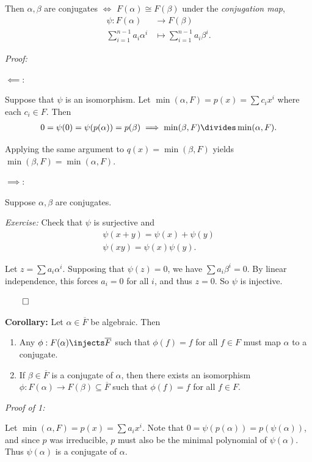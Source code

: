 Then \(\alpha, \beta\) are conjugates \(\iff\)
\(F(\alpha) \cong F(\beta)\) under the \emph{conjugation map},
\begin{align*}
\psi: F(\alpha) &\to F(\beta) \\
\sum_{i=1}^{n-1} a_i \alpha^i &\mapsto \sum_{i=1}^{n-1} a_i \beta^i
.\end{align*}

\emph{Proof:}

\(\impliedby\):

Suppose that \(\psi\) is an isomorphism. Let
\(\min(\alpha, F) = p(x) = \sum c_i x^i\) where each \(c_i \in F\). Then
\begin{align*}
0 = \psi(0) = \psi(p(\alpha)) = p(\beta) \implies \min(\beta, F) \divides \min(\alpha, F)
.\end{align*}

Applying the same argument to \(q(x) = \min(\beta, F)\) yields
\(\min(\beta, F) = \min(\alpha, F)\).

\(\implies\):

Suppose \(\alpha, \beta\) are conjugates.

\emph{Exercise:} Check that \(\psi\) is surjective and \begin{align*}
\psi(x+y) = \psi(x) + \psi(y) \\
\psi(xy) = \psi(x) \psi(y)
.\end{align*}

Let \(z = \sum a_i \alpha^i\). Supposing that \(\psi(z) = 0\), we have
\(\sum a_i \beta^i = 0\). By linear independence, this forces
\(a_i = 0\) for all \(i\), and thus \(z=0\). So \(\psi\) is injective.

\(\qed\)

\textbf{Corollary:} Let \(\alpha \in \overline F\) be algebraic. Then

\begin{enumerate}
\def\labelenumi{\arabic{enumi}.}
\item
  Any \(\phi: F(\alpha) \injects \overline F\) such that \(\phi(f) = f\)
  for all \(f\in F\) must map \(\alpha\) to a conjugate.
\item
  If \(\beta \in \overline F\) is a conjugate of \(\alpha\), then there
  exists an isomorphism
  \(\phi: F(\alpha) \to F(\beta) \subseteq \overline F\) such that
  \(\phi(f) = f\) for all \(f\in F\).
\end{enumerate}

\emph{Proof of 1:}

Let \(\min(\alpha, F) = p(x) = \sum a_i x^i\). Note that
\(0 = \psi(p(\alpha)) = p(\psi(\alpha))\), and since \(p\) was
irreducible, \(p\) must also be the minimal polynomial of
\(\psi(\alpha)\). Thus \(\psi(\alpha)\) is a conjugate of \(\alpha\).

